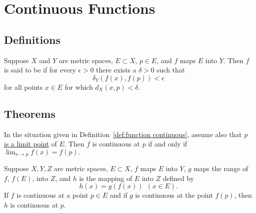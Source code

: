 \section{Continuous Functions}
\subsection{Definitions}
\begin{deff}\label{def:function continuous}
	Suppose $X$ and $Y$ are metric spaces, $E \subset X$, $p \in E$, and $f$ maps $E$ into $Y$. Then $f$ is said to be {}  if for every $\epsilon > 0$ there exists a $\delta >0 $ such that $$\delta_Y(f(x),f(p)) < \epsilon$$ for all points $x \in E$ for which $d_X(x,p) < \delta.$
\end{deff}

\subsection{Theorems}
\begin{thm}
	In the situation given in Definition~\ref{def:function continuous}, assume also that {\underline{$p$ is a limit point}}  of $E$. Then $f$ is continuous at $p$ if and only if $\lim_{x \to p} f(x) = f(p).$
\end{thm}

\begin{thm}
	Suppose $X, Y, Z$ are metric spaces, $E \subset X$, $f$ maps $E$ into $Y$, $g$ maps the range of $f$, $f(E)$, into $Z$, and $h$ is the mapping of $E$ into $Z$ defined by $$h(x) = g(f(x)) ~ ~ (x \in E).$$ If $f$ is continuous at a point $p \in E$ and if $g$ is continuous at the point $f(p)$, then $h$ is continuous at $p$.
\end{thm}




